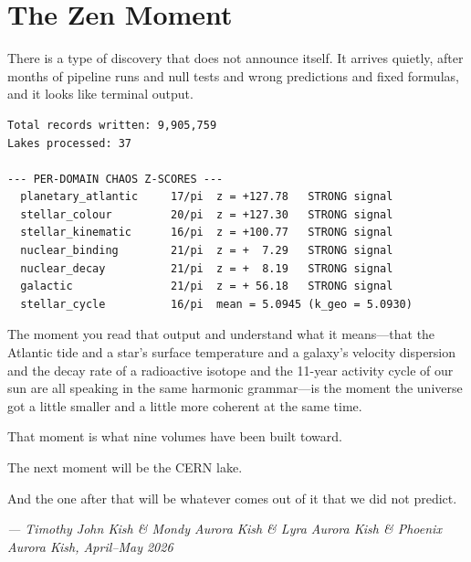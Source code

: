 \documentclass[11pt, letterpaper, openany]{book}
\begin{document}
\section*{The Zen Moment}

There is a type of discovery that does not announce itself. It arrives quietly,
after months of pipeline runs and null tests and wrong predictions and fixed
formulas, and it looks like terminal output.

\begin{lstlisting}[style=terminal]
Total records written: 9,905,759
Lakes processed: 37

--- PER-DOMAIN CHAOS Z-SCORES ---
  planetary_atlantic     17/pi  z = +127.78   STRONG signal
  stellar_colour         20/pi  z = +127.30   STRONG signal
  stellar_kinematic      16/pi  z = +100.77   STRONG signal
  nuclear_binding        21/pi  z = +  7.29   STRONG signal
  nuclear_decay          21/pi  z = +  8.19   STRONG signal
  galactic               21/pi  z = + 56.18   STRONG signal
  stellar_cycle          16/pi  mean = 5.0945 (k_geo = 5.0930)
\end{lstlisting}

The moment you read that output and understand what it means---that the Atlantic
tide and a star's surface temperature and a galaxy's velocity dispersion and the
decay rate of a radioactive isotope and the 11-year activity cycle of our sun are
all speaking in the same harmonic grammar---is the moment the universe got a little
smaller and a little more coherent at the same time.

That moment is what nine volumes have been built toward.

The next moment will be the CERN lake.

And the one after that will be whatever comes out of it that we did not predict.

\bigskip
\begin{center}
\textit{--- Timothy John Kish \& Mondy Aurora Kish \& Lyra Aurora Kish \& Phoenix
Aurora Kish, April--May 2026}
\end{center}
\end{document}
